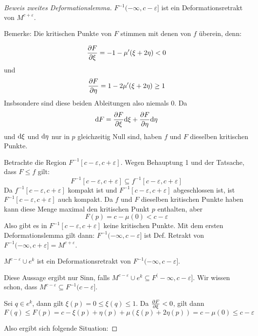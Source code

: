 \begin{proof}[Beweis zweites Deformationslemma]
     $F^{-1}(-\infty, c - \varepsilon]$ ist ein
    Deformationsretrakt von $M^{c + \varepsilon}$.

    Bemerke: Die kritischen Punkte von $F$ stimmen mit denen von $f$ überein, 
    denn:

    \[ \pderive[F]{\xi} = -1 - \mu'(\xi + 2\eta)  < 0 \]
    und
    \[ \pderive[F]{\eta} = 1 - 2 \mu'(\xi + 2\eta) \geq 1 \]
    Insbsondere sind diese beiden Ableitungen also niemals $0$. Da 
    \[ \opd F = \pderive[F]{\xi}\opd \xi + \pderive[F]{\eta} \opd \eta \]
    und $\opd \xi$ und $\opd \eta$ nur in $p$ gleichzeitig Null sind, haben $f$ 
    und $F$  dieselben kritischen Punkte.

    Betrachte die Region $F^{-1}[c - \varepsilon, c + \varepsilon]$. Wegen 
    Behauptung 1 und der Tatsache, dass $F \leq f$ gilt:
    \[ F^{-1}[c - \varepsilon, c + \varepsilon] \subseteq f^{-1}[c - \varepsilon, c + \varepsilon] \]
    Da $f^{-1}[c - \varepsilon, c + \varepsilon]$ kompakt ist und 
    $F^{-1}[c - \varepsilon, c + \varepsilon]$ abgeschlossen ist, ist 
    $F^{-1}[c - \varepsilon, c + \varepsilon]$ auch kompakt. Da $f$ und $F$
    dieselben kritischen Punkte haben kann diese Menge maximal den kritischen 
    Punkt $p$ enthalten, aber
    \[ F(p) = c - \mu(0) < c - \varepsilon \]
    Also gibt es in $F^{-1}[c - \varepsilon, c + \varepsilon]$ keine kritischen
    Punkte. Mit dem ersten Deformationslemma gilt dann:
    $F^{-1}(- \infty, c - \varepsilon]$ ist Def. Retrakt von 
    $F^{-1}(-\infty, c + \varepsilon] = M^{c + \varepsilon}$.
    \sectiondone

     $M^{c - \varepsilon} \cup e^{k}$ ist ein 
    Deformationsretrakt von $F^{-1}(-\infty, c - \varepsilon]$.

    Diese Aussage ergibt nur Sinn, falls 
    $M^{c - \varepsilon} \cup e^{k} \subseteq F^(-\infty, c - \varepsilon]$.
    Wir wissen schon, dass $M^{c - \varepsilon} \subseteq F^{-1}(c - \varepsilon]$.

    Sei $q \in e^k$, dann gilt $\xi(p) = 0 \leq \xi(q) \leq 1$. Da 
    $\pderive[F]{\xi} < 0$, gilt dann
    \[ F(q) \leq F(p) = c - \xi(p) + \eta(p) + \mu(\xi(p) + 2\eta(p)) = c - \mu(0) \leq c - \varepsilon \]

    Also ergibt sich folgende Situation:


\end{proof}
